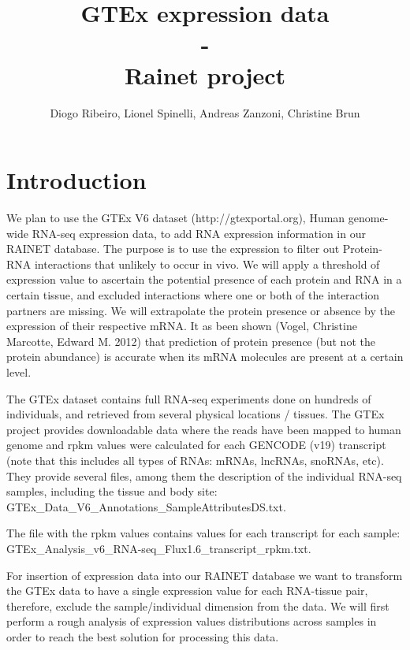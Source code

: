 \documentclass{article}\usepackage[]{graphicx}\usepackage[]{color}
\begin{document}
\title{GTEx expression data\\-\\
        Rainet project}
\author{Diogo Ribeiro, Lionel Spinelli, Andreas Zanzoni, Christine Brun}
\maketitle

\section{Introduction} 

We plan to use the GTEx V6 dataset (http://gtexportal.org), Human genome-wide RNA-seq expression data, to add RNA expression information in our RAINET database. 
The purpose is to use the expression to filter out Protein-RNA interactions that unlikely to occur in vivo. We will apply a threshold of expression value to ascertain the potential presence of each protein and RNA in a certain tissue, and excluded interactions where one or both of the interaction partners are missing. 
We will extrapolate the protein presence or absence by the expression of their respective mRNA. It as been shown (Vogel, Christine Marcotte, Edward M. 2012) that prediction of protein presence (but not the protein abundance) is accurate when its mRNA molecules are present at a certain level. \par
The GTEx dataset contains full RNA-seq experiments done on hundreds of individuals, and retrieved from several physical locations / tissues. 
The GTEx project provides downloadable data where the reads have been mapped to human genome and rpkm values were calculated for each GENCODE (v19) transcript (note that this includes all types of RNAs: mRNAs, lncRNAs, snoRNAs, etc).
They provide several files, among them the description of the individual RNA-seq samples, including the tissue and body site:
GTEx\_Data\_V6\_Annotations\_SampleAttributesDS.txt. \par
The file with the rpkm values contains values for each transcript for each sample:
GTEx\_Analysis\_v6\_RNA-seq\_Flux1.6\_transcript\_rpkm.txt. \par
For insertion of expression data into our RAINET database we want to transform the GTEx data to have a single expression value for each RNA-tissue pair, therefore, exclude the sample/individual dimension from the data. 
We will first perform a rough analysis of expression values distributions across samples in order to reach the best solution for processing this data.
\end{document}
